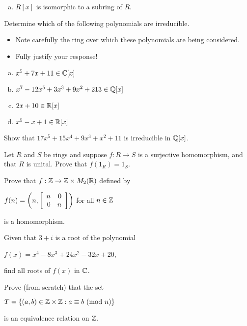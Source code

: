 \documentclass[11pt]{exam}
\begin{document}
\begin{questions}
\begin{enumerate}[(a)]
\item \underline{\hspace{1cm}} $R[x]$ is isomorphic to a subring of $R$.
\vsp



\end{enumerate}
\newpage

\question[6] Determine which of the following polynomials are irreducible.
\begin{itemize}
\item Note carefully the ring over which these polynomials are being considered.
\item Fully justify your response!
\end{itemize}
\begin{enumerate}[(a)]
\item $x^5 + 7x + 11\in \C[x]$
\vfill

\item $x^7 - 12x^5 + 3x^3 + 9x^2 + 213\in\Q[x]$
\vfill

\item $2x + 10 \in \R[x]$
\vfill

\item $x^5 - x + 1\in \R[x]$
\vfill
\end{enumerate}
\newpage

\question[3] Show that $17x^5 + 15x^4 + 9x^3 + x^2 + 11$ is irreducible in $\Q[x]$.
\newpage

\question[3] Let $R$ and $S$ be rings and suppose $f:R\to S$ is a surjective homomorphism, and that $R$ is unital.  Prove that $f(1_{R}) = 1_{S}$.
\vspace{5cm}


\question[3] Prove that $f:\Z\to \Z\times M_{2}(\R)$ defined by
\begin{center}
$f(n) = \left(n,\MATRIX{rr}{n & 0\\0 & n}\right)$ for all $n\in \Z$
\end{center}
is a homomorphism.
\vfill

\newpage

\question[3] Given that $3 + i$ is a root of the polynomial
\begin{center}
$f(x) = x^4 - 8x^3 + 24x^2 - 32x + 20$,
\end{center}
find all roots of $f(x)$ in $\C$.
\newpage

\question[5] Prove (from scratch) that the set
\begin{center}
$T = \SET{(a,b)\in \Z\times \Z:a\equiv b\text{ (mod }n\text{)}}$
\end{center}
is an equivalence relation on $\Z$.
\newpage


\end{questions}
\end{document}
